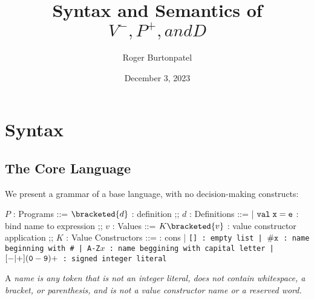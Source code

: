 \documentclass[]{article}
\title{Syntax and Semantics of $V^{-}, P^{+}, and D$}
\author{Roger Burtonpatel}
\date{December 3, 2023}
\begin{document}
\maketitle

\section{Syntax}

\subsection{The Core Language}

We present a grammar of a base language, with no decision-making constructs: 

\bigskip

\begin{center}
    \begin{bnf}
    $P$ : \textsf{Programs} ::=
    $\bracketed{d}$ : definition
    ;;
    $d$ : \textsf{Definitions} ::=
    | $\tt{val} \; x \; \tt{=} \; e$ : bind name to expression
    ;;
    $v$ : Values ::= $K\bracketed{v}$ : value constructor application 
    ;;
    $K$ : \textsf{Value Constructors} ::=
    \cons : cons 
    | \tt{[]} : empty list 
    | $\tt{\#}x$ : name beginning with \tt{\#}
    | \tt{A-Z}$x$ : name beggining with capital letter
    | $[\tt{-}\vert\tt{+}](\tt{0}-\tt{9})+$ : signed integer literal 

    \end{bnf}
\end{center}


A \it{name} is any token that is not an integer literal, 
does not contain whitespace, a bracket, or parenthesis, 
and is not a value constructor name or a reserved word.
\end{document}

